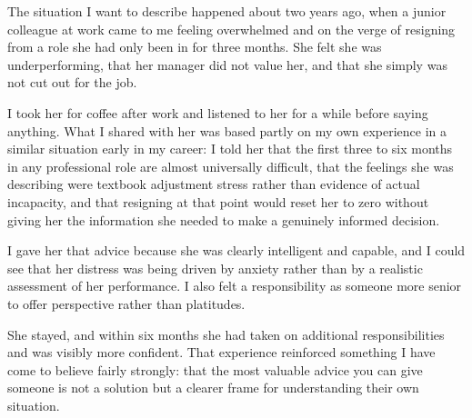 \begin{ieltsanswer}
The situation I want to describe happened about two years ago, when a junior colleague at work came to me feeling overwhelmed and on the verge of resigning from a role she had only been in for three months. She felt she was underperforming, that her manager did not value her, and that she simply was not cut out for the job.

I took her for coffee after work and listened to her for a while before saying anything. What I shared with her was based partly on my own experience in a similar situation early in my career: I told her that the first three to six months in any professional role are almost universally difficult, that the feelings she was describing were textbook adjustment stress rather than evidence of actual incapacity, and that resigning at that point would reset her to zero without giving her the information she needed to make a genuinely informed decision.

I gave her that advice because she was clearly intelligent and capable, and I could see that her distress was being driven by anxiety rather than by a realistic assessment of her performance. I also felt a responsibility as someone more senior to offer perspective rather than platitudes.

She stayed, and within six months she had taken on additional responsibilities and was visibly more confident. That experience reinforced something I have come to believe fairly strongly: that the most valuable advice you can give someone is not a solution but a clearer frame for understanding their own situation.
\end{ieltsanswer}


